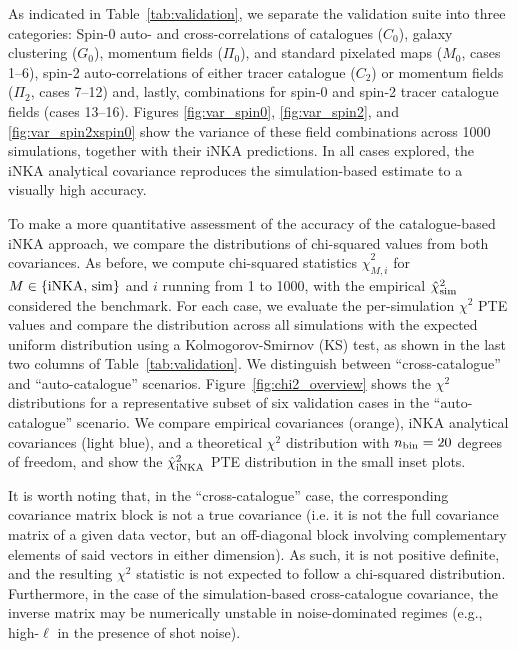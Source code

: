 \documentclass[%
 reprint,
superscriptaddress,
nofootinbib,
 amsmath,amssymb,
 aps,
 prd,
]{revtex4-2}
\begin{document}
    As indicated in Table~\ref{tab:validation}, we separate the validation suite into three categories: Spin-0 auto- and cross-correlations of catalogues ($C_0$), galaxy clustering ($G_0$), momentum fields ($\Pi_0$), and standard pixelated maps ($M_0$,  cases 1--6), spin-2 auto-correlations of either tracer catalogue ($C_2$) or momentum fields ($\Pi_2$, cases 7--12) and, lastly, combinations for spin-0 and spin-2 tracer catalogue fields (cases 13--16). Figures \ref{fig:var_spin0}, \ref{fig:var_spin2}, and \ref{fig:var_spin2xspin0} show the variance of these field combinations across 1000 simulations, together with their iNKA predictions. In all cases explored, the iNKA analytical covariance reproduces the simulation-based estimate to a visually high accuracy.
    
    To make a more quantitative assessment of the accuracy of the catalogue-based iNKA approach, we compare the distributions of chi-squared values from both covariances. As before, we compute chi-squared statistics $\hat{\chi}^2_{M,i}$ for $M\in\{{\rm iNKA},\,{\rm sim}\}$ and $i$ running from 1 to 1000, with the empirical $\hat{\chi}^2_{\rm sim}$ considered the benchmark. For each case, we evaluate the per-simulation $\chi^2$ PTE values and compare the distribution across all simulations with the expected uniform distribution using a Kolmogorov-Smirnov (KS) test, as shown in the last two columns of Table~\ref{tab:validation}. We distinguish between ``cross-catalogue'' and ``auto-catalogue'' scenarios. Figure~\ref{fig:chi2_overview} shows the $\chi^2$ distributions for a representative subset of six validation cases in the ``auto-catalogue'' scenario. We compare empirical covariances (orange), iNKA analytical covariances (light blue), and a theoretical $\chi^2$ distribution with $n_{\rm bin}=20$ degrees of freedom, and show the $\hat{\chi}_{\rm iNKA}^2$ PTE distribution in the small inset plots.

    It is worth noting that, in the ``cross-catalogue'' case, the corresponding covariance matrix block is not a true covariance (i.e. it is not the full covariance matrix of a given data vector, but an off-diagonal block involving complementary elements of said vectors in either dimension). As such, it is not positive definite, and the resulting $\chi^2$ statistic is not expected to follow a chi-squared distribution. Furthermore, in the case of the simulation-based cross-catalogue covariance, the inverse matrix may be numerically unstable in noise-dominated regimes (e.g., high-$\ell$ in the presence of shot noise).
    
\end{document}
